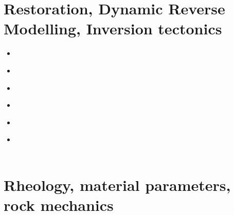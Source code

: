 \section{Restoration, Dynamic Reverse Modelling, Inversion tectonics}

\begin{scriptsize}
\begin{itemize}
\item[\twothousandone] 
\textcite{istv01} \\
\item[\twothousandfour] 
\textcite{istt04} \\
\item[\twothousandfive] 
\textcite{koma05} \\
\item[\twothousandtwelve] 
\textcite{lofg12} \\
\item[\twothousandeighteen] 
\textcite{lojm18} \\
\item[\twothousandtwenty] 
\textcite{sctc20} \\
\textcite{taas20} \\
\end{itemize}
\end{scriptsize}

\section{Rheology, material parameters, rock mechanics}

